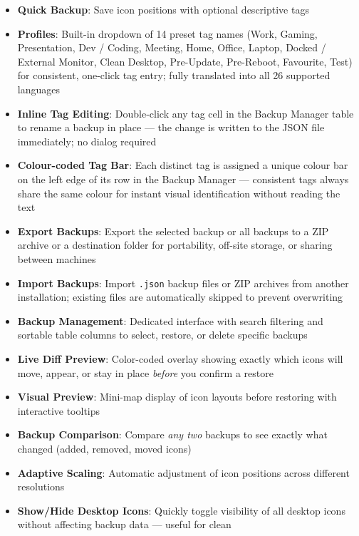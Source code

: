 \documentclass[a4paper,11pt]{article}
\begin{document}
\begin{itemize}[leftmargin=*]
  \item \textbf{Quick Backup}: Save icon positions with optional
    descriptive tags
  \item \textbf{Profiles}: Built-in dropdown of 14 preset tag
    names (Work, Gaming, Presentation, Dev / Coding, Meeting, Home,
      Office, Laptop, Docked / External Monitor, Clean Desktop,
    Pre-Update, Pre-Reboot, Favourite, Test) for consistent,
    one-click tag entry; fully translated into all 26 supported
    languages
  \item \textbf{Inline Tag Editing}: Double-click any tag cell in the
    Backup Manager table to rename a backup in place --- the change is
    written to the JSON file immediately; no dialog required
  \item \textbf{Colour-coded Tag Bar}: Each distinct tag is assigned a
    unique colour bar on the left edge of its row in the Backup Manager
    --- consistent tags always share the same colour for instant visual
    identification without reading the text
  \item \textbf{Export Backups}: Export the selected backup or all
    backups to a ZIP archive or a destination folder for portability,
    off-site storage, or sharing between machines
  \item \textbf{Import Backups}: Import \texttt{.json} backup files or
    ZIP archives from another installation; existing files are
    automatically skipped to prevent overwriting
  \item \textbf{Backup Management}: Dedicated interface with search
    filtering and sortable table columns to select, restore, or
    delete specific backups
  \item \textbf{Live Diff Preview}: Color-coded overlay showing exactly
    which icons will move, appear, or stay in place \textit{before} you
    confirm a restore
  \item \textbf{Visual Preview}: Mini-map display of icon layouts
    before restoring with interactive tooltips
  \item \textbf{Backup Comparison}: Compare \textit{any two} backups
    to see exactly what changed (added, removed, moved icons)
  \item \textbf{Adaptive Scaling}: Automatic adjustment of icon
    positions across different resolutions
  \item \textbf{Show/Hide Desktop Icons}: Quickly toggle visibility of
    all desktop icons without affecting backup data --- useful for clean

\end{itemize}
\end{document}
